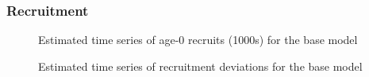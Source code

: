 \documentclass[
]{scrartcl}
\begin{document}
\clearpage

\subsubsection{Recruitment}\label{recruitment}



\begin{figure}


\caption{\label{fig-es-frac-unfished}Estimated time series of age-0
recruits (1000s) for the base model}

\end{figure}%

\begin{figure}


\caption{\label{fig-es-rec-devs}Estimated time series of recruitment
deviations for the base model}

\end{figure}%
\end{document}

